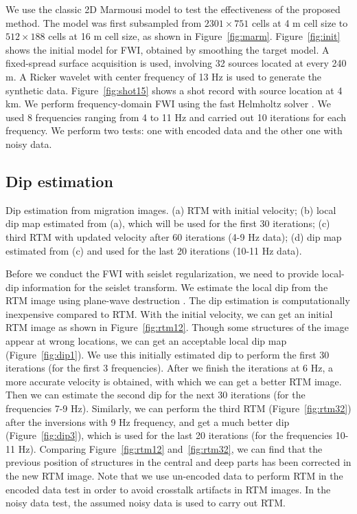 We use the classic 2D Marmousi model \cite[]{bourgeois91} to test the effectiveness of the proposed method.
The model was first subsampled from $2301\times751$ cells at 4 m cell size to $512 \times 188$ cells at 16 m cell size, as shown in Figure~\ref{fig:marm}.
Figure~\ref{fig:init} shows the initial model for FWI, obtained by smoothing the target model.
A fixed-spread surface acquisition is used, involving 32 sources located at every 240 m.
A Ricker wavelet with center frequency of 13 Hz is used to generate the synthetic data. 
Figure~\ref{fig:shot15} shows a shot record with source location at 4 km.
We perform frequency-domain FWI using the fast Helmholtz solver \cite[]{li14}. 
We used 8 frequencies ranging from 4 to 11 Hz and carried out 10 iterations for each frequency.
We perform two tests: one with encoded data and the other one with noisy data.

\subsection{Dip estimation}
{Dip estimation from migration images. (a) RTM with initial velocity; (b) local dip map estimated from (a), which will be used for the first 30 iterations;
(c) third RTM with updated velocity after 60 iterations (4-9 Hz data);
(d) dip map estimated from (c) and used for the last 20 iterations (10-11 Hz data).}

Before we conduct the FWI with seislet regularization, we need to provide local-dip information for the seislet transform.
We estimate the local dip from the RTM image using plane-wave destruction \cite[]{fomel02}.
The dip estimation is computationally inexpensive compared to RTM.
With the initial velocity, we can get an initial RTM image as shown in Figure~\ref{fig:rtm12}.
Though some structures of the image appear at wrong locations, we can get an acceptable local dip map (Figure~\ref{fig:dip1}).
We use this initially estimated dip to perform the first 30 iterations (for the first 3 frequencies).
After we finish the iterations at 6 Hz, a more accurate velocity is obtained, with which we can get a better RTM image.
Then we can estimate the second dip for the next 30 iterations (for the frequencies 7-9 Hz).
Similarly, we can perform the third RTM (Figure~\ref{fig:rtm32}) after the inversions with 9 Hz frequency, 
and get a much better dip (Figure~\ref{fig:dip3}), which is used for the last 20 iterations (for the frequencies 10-11 Hz).
Comparing Figure~\ref{fig:rtm12} and~\ref{fig:rtm32}, we can find that the previous position of structures in the central and deep parts has been corrected in the new RTM image.
Note that we use un-encoded data to perform RTM in the encoded data test in order to avoid crosstalk artifacts in RTM images.
In the noisy data test, the assumed noisy data is used to carry out RTM.

